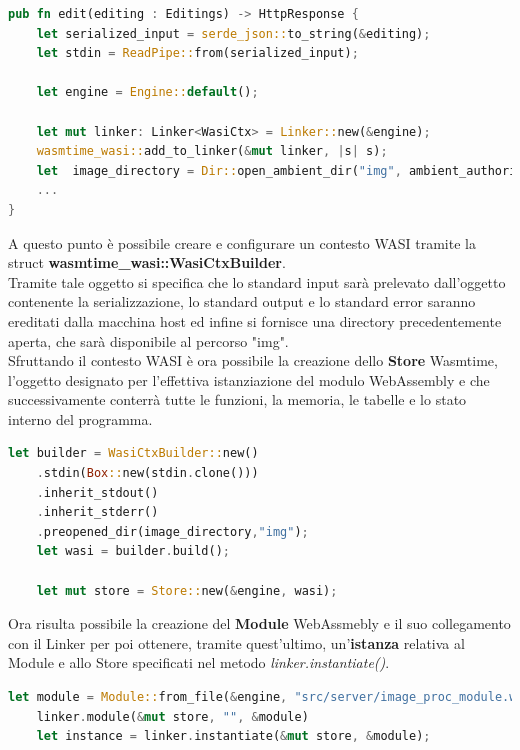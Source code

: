 \begin{lstlisting}[language=rust, caption={File handlers.rs: operazioni preliminari}, showstringspaces=false]
pub fn edit(editing : Editings) -> HttpResponse {
    let serialized_input = serde_json::to_string(&editing);
    let stdin = ReadPipe::from(serialized_input);
    
    let engine = Engine::default();
    
    let mut linker: Linker<WasiCtx> = Linker::new(&engine);
    wasmtime_wasi::add_to_linker(&mut linker, |s| s); 
    let  image_directory = Dir::open_ambient_dir("img", ambient_authority());
    ...
}
\end{lstlisting}
A questo punto è possibile creare e configurare un contesto WASI tramite la struct \textbf{wasmtime\_wasi::WasiCtxBuilder}.
\\Tramite tale oggetto si specifica che lo standard input sarà prelevato dall'oggetto contenente la serializzazione, lo standard output e lo standard error saranno ereditati dalla macchina host ed infine si fornisce una directory precedentemente aperta, che sarà disponibile al percorso "img".
\\Sfruttando il contesto WASI è ora possibile la creazione dello \textbf{Store} Wasmtime, l'oggetto designato per l'effettiva istanziazione del modulo WebAssembly e che successivamente conterrà tutte le funzioni, la memoria, le tabelle e lo stato interno del programma.
\begin{lstlisting}[language=rust,caption={File handlers.rs: creazione di contesto WASI e Store}, showstringspaces=false]
    let builder = WasiCtxBuilder::new()
    .stdin(Box::new(stdin.clone()))
    .inherit_stdout()
    .inherit_stderr()
    .preopened_dir(image_directory,"img");
    let wasi = builder.build();
    
    let mut store = Store::new(&engine, wasi);
\end{lstlisting}
Ora risulta possibile la creazione del \textbf{Module} WebAssmebly e il suo collegamento con il Linker per poi ottenere, tramite quest'ultimo, un'\textbf{istanza} relativa al Module e allo Store specificati nel metodo \emph{linker.instantiate()}.
\newpage
\begin{lstlisting}[language=rust,caption={File handlers.rs: istanziazione modulo Wasm}, showstringspaces=false]
    let module = Module::from_file(&engine, "src/server/image_proc_module.wasm");
    linker.module(&mut store, "", &module) 
    let instance = linker.instantiate(&mut store, &module);
\end{lstlisting}
